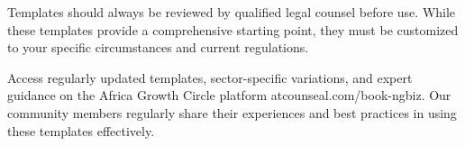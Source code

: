 \begin{warningbox}
Templates should always be reviewed by qualified legal counsel before use. While these templates provide a comprehensive starting point, they must be customized to your specific circumstances and current regulations.
\end{warningbox}

\begin{communitybox}
Access regularly updated templates, sector-specific variations, and expert guidance on the Africa Growth Circle platform atcounseal.com/book-ngbiz. Our community members regularly share their experiences and best practices in using these templates effectively.
\end{communitybox}